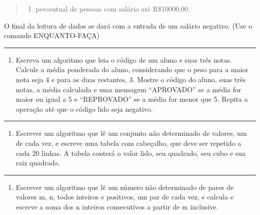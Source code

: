 \documentclass[12pt,a4paper]{article}
\providecommand{\tightlist}{%
      \setlength{\itemsep}{0pt}\setlength{\parskip}{0pt}}
\begin{document}
\begin{quote}
\begin{enumerate}
\def\labelenumi{\alph{enumi})}
\setcounter{enumi}{3}
\tightlist
\item
  percentual de pessoas com salário até R\$10000,00.
\end{enumerate}
\end{quote}

O final da leitura de dados se dará com a entrada de um salário
negativo. (Use o comando ENQUANTO-FAÇA)

    \begin{center}\rule{0.5\linewidth}{0.5pt}\end{center}

\begin{enumerate}
\def\labelenumi{\arabic{enumi}.}
\setcounter{enumi}{5}
\tightlist
\item
  Escreva um algoritmo que leia o código de um aluno e suas três notas.
  Calcule a média ponderada do aluno, considerando que o peso para a
  maior nota seja 4 e para as duas restantes, 3. Mostre o código do
  aluno, suas três notas, a média calculada e uma mensagem ``APROVADO''
  se a média for maior ou igual a 5 e ``REPROVADO'' se a média for menor
  que 5. Repita a operação até que o código lido seja negativo.
\end{enumerate}

    \begin{center}\rule{0.5\linewidth}{0.5pt}\end{center}

\begin{enumerate}
\def\labelenumi{\arabic{enumi}.}
\setcounter{enumi}{6}
\tightlist
\item
  Escrever um algoritmo que lê um conjunto não determinado de valores,
  um de cada vez, e escreve uma tabela com cabeçalho, que deve ser
  repetido a cada 20 linhas. A tabela conterá o valor lido, seu
  quadrado, seu cubo e sua raiz quadrada.
\end{enumerate}

    \begin{center}\rule{0.5\linewidth}{0.5pt}\end{center}

\begin{enumerate}
\def\labelenumi{\arabic{enumi}.}
\setcounter{enumi}{7}
\tightlist
\item
  Escrever um algoritmo que lê um número não determinado de pares de
  valores m, n, todos inteiros e positivos, um par de cada vez, e
  calcula e escreve a soma dos n inteiros consecutivos a partir de m
  inclusive.
\end{enumerate}
\end{document}
